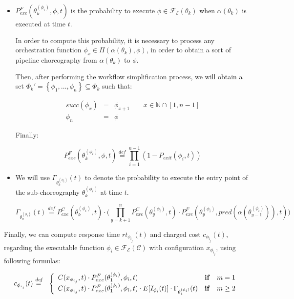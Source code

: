 \documentclass[12pt,a4paper]{report}
\newcommand{\mathDef}{\overset{\textit{def}}{=}}
\newcommand{\N}{\mathbb{N}}
\newcommand{\SetFromOneTo}[1]{\N \cap \left[1,#1\right]}
\begin{document}
\begin{itemize}
	
	\item $P_{exe}^F(\theta^{(\phi_i)}_k, \phi, t)$ is the probability to execute $\phi \in \mathscr{F_E}(\theta_k)$ when $\alpha(\theta_k)$ is executed at time $t$. 
	
	In order to compute this probability, it is necessary to process any orchestration function $\phi_x \in \Pi(\alpha(\theta_k),\phi)$, in order to obtain a sort of pipeline choreography from $\alpha(\theta_k)$ to $\phi$.
	
	Then, after performing the workflow simplification process, we will obtain a set $\Phi_k' = \left\{\phi_1, \ldots, \phi_n \right\} \subseteq \Phi_k$ such that:
	
	\begin{eqnarray}
		succ(\phi_x) & = &  \phi_{x+1}  \qquad x \in \SetFromOneTo{n -1} \\ \phi_n & = & \phi
	\end{eqnarray}
	
	Finally:
		
	\begin{equation}
		P_{exe}^F(\theta^{(\phi_i)}_k, \phi, t) \mathDef \prod_{i = 1}^{n-1} (1 - P_{exit}(\phi_i,t))
	\end{equation}
	
	
\item We will use $\Gamma_{\theta_k^{(\phi_{i})}}(t)$ to denote the probability to execute the entry point of the sub-choreography $\theta_k^{(\phi_{i})}$ at time $t$.

\begin{equation}
	\Gamma_{\theta_k^{(\phi_{i})}}(t) \mathDef P_{exe}^C(\theta^{(\phi_i)}_{k},t) \cdot \Bigg( \prod_{y = k + 1}^{n}  P_{exe}^C(\theta^{(\phi_i)}_{y},t) \cdot P_{exe}^{F}(\theta^{(\phi_i)}_{y}, pred(\alpha(\theta^{(\phi_i)}_{y-1})),t) \Bigg)
\end{equation}

\end{itemize}

Finally, we can compute response time $rt_{\phi_{i_{j}}}(t)$ and charged cost $c_{\phi_{i_{j}}}(t)$, regarding the executable function $\phi_i \in \mathscr{F_E}(\mathcal{C})$ with configuration $x_{\phi_{i_{j}}}$, using following formulas:

\begin{eqnarray}
	c_{\phi_{i_{j}}}(t) & \mathDef & \left\{ 
	\begin{array}{lcl}
		C(x_{\phi_{i_{j}}},t) \cdot P_{exe}^{F}(\theta^{(\phi_i)}_1, \phi_i,t) & \text{\textbf{if}} & m = 1 \nonumber\\ 
		C(x_{\phi_{i_{j}}},t) \cdot P_{exe}^{F}(\theta^{(\phi_i)}_1, \phi_i,t) \cdot E[I_{\phi_i}(t)] \cdot \Gamma_{\theta_1^{(\phi_{i})}}(t) & \text{\textbf{if}} & m \geq 2 \\ 
	\end{array} \right.\label{cost}\\
\end{eqnarray}
\end{document}
